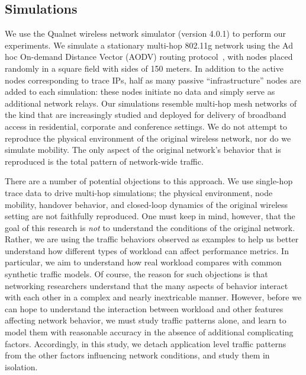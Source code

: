 \documentclass[twocolumn,final]{svjour3}
\newcommand{\caps}[1]{{\small{#1}}}
\begin{document}
\subsection{Simulations}
\label{sec:simulations}

We use the Qualnet wireless network simulator (version 4.0.1) to perform our experiments. We simulate a stationary multi-hop 802.11g network using the Ad hoc On-demand Distance Vector (\caps{AODV}) routing protocol~\cite{rfc:aodv}, with nodes placed randomly in a square field with sides of 150 meters.
In addition to the active nodes corresponding to trace \caps{IP}s, half as many passive ``infrastructure'' nodes are added to each simulation: these nodes initiate no data and simply serve as additional network relays. Our simulations resemble multi-hop mesh networks of the kind that are increasingly studied and deployed for delivery of broadband access in residential, corporate and conference settings. We do not attempt to reproduce the physical environment of the original wireless network, nor do we simulate mobility. The only aspect of the original network's behavior that is reproduced is the total pattern of network-wide traffic.

There are a number of potential objections to this approach. We use single-hop trace data to drive multi-hop simulations; the physical environment, node mobility, handover behavior, and closed-loop dynamics of the original wireless setting are not faithfully reproduced. One must keep in mind, however, that the goal of this research is \textit{not} to understand the conditions of the original network. Rather, we are using the traffic behaviors observed as examples to help us better understand how different types of workload can affect performance metrics. In particular, we aim to understand how real workload compares with common synthetic traffic models. Of course, the reason for such objections is that networking researchers understand that the many aspects of behavior interact with each other in a complex and nearly inextricable manner. However, before we can hope to understand the interaction between workload and other features affecting network behavior, we must study traffic patterns alone, and learn to model them with reasonable accuracy in the absence of additional complicating factors. Accordingly, in this study, we detach application level traffic patterns from the other factors influencing network conditions, and study them in isolation.
\end{document}
